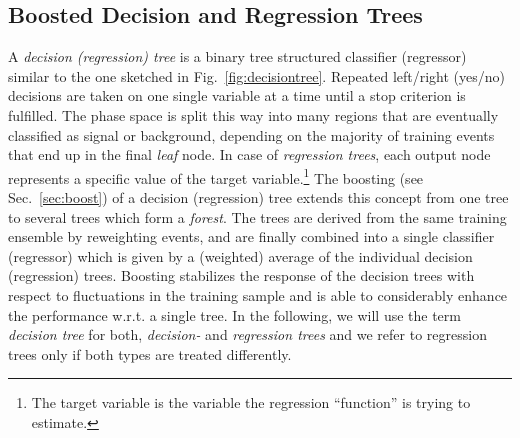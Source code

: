 \subsection{Boosted Decision and Regression Trees}
\label{sec:bdt}

A {\em decision (regression) tree} is a
binary tree structured classifier (regressor) similar to the one sketched in
Fig.~\ref{fig:decisiontree}. Repeated left/right (yes/no) decisions
are taken on one single variable at a time until a stop criterion
is fulfilled.  The phase space is split this way into many regions that are
eventually classified as signal or background, depending on the
majority of training events that end up in the final {\em leaf}
node. In case of {\em regression trees}, each output node represents 
a specific value of the target variable.\footnote{The target variable 
is the variable the regression ``function'' is trying to estimate.} The
boosting (see Sec.~\ref{sec:boost}) of a decision (regression) tree extends 
this concept from one tree to several trees which form a 
{\em forest}. The trees are derived from the same 
training ensemble by reweighting events, and are finally combined into a 
single classifier (regressor)
which is given by a (weighted) average of the individual decision
(regression) trees. Boosting stabilizes the response of the decision
trees with respect to fluctuations in the training sample and is able
to considerably enhance the performance w.r.t. a single tree.  In the
following, we will use the term {\em decision tree } for both, {\em
  decision-} and {\em regression trees} and we refer to regression
trees only if both types are treated differently. 
